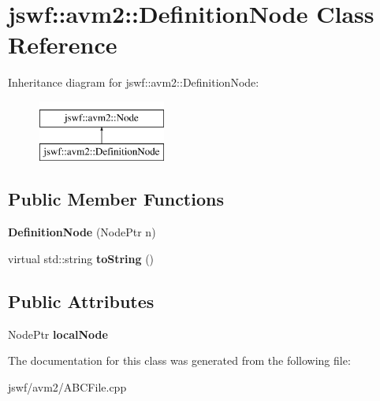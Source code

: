 \hypertarget{classjswf_1_1avm2_1_1_definition_node}{\section{jswf\+:\+:avm2\+:\+:Definition\+Node Class Reference}
\label{classjswf_1_1avm2_1_1_definition_node}
}
Inheritance diagram for jswf\+:\+:avm2\+:\+:Definition\+Node\+:\begin{figure}[H]
\begin{center}
\leavevmode
\includegraphics[height=2.000000cm]{classjswf_1_1avm2_1_1_definition_node}
\end{center}
\end{figure}
\subsection*{Public Member Functions}
\begin{DoxyCompactItemize}
\item 
\hypertarget{classjswf_1_1avm2_1_1_definition_node_afbf8abf51da19ba01905a0c10639a67c}{{\bfseries Definition\+Node} (Node\+Ptr n)}\label{classjswf_1_1avm2_1_1_definition_node_afbf8abf51da19ba01905a0c10639a67c}

\item 
\hypertarget{classjswf_1_1avm2_1_1_definition_node_ae9c408335f260fba0aad50cd4b744b85}{virtual std\+::string {\bfseries to\+String} ()}\label{classjswf_1_1avm2_1_1_definition_node_ae9c408335f260fba0aad50cd4b744b85}

\end{DoxyCompactItemize}
\subsection*{Public Attributes}
\begin{DoxyCompactItemize}
\item 
\hypertarget{classjswf_1_1avm2_1_1_definition_node_a03e5a22ae2f364b3eeb9301768ef89ee}{Node\+Ptr {\bfseries local\+Node}}\label{classjswf_1_1avm2_1_1_definition_node_a03e5a22ae2f364b3eeb9301768ef89ee}

\end{DoxyCompactItemize}


The documentation for this class was generated from the following file\+:\begin{DoxyCompactItemize}
\item 
jswf/avm2/A\+B\+C\+File.\+cpp\end{DoxyCompactItemize}
